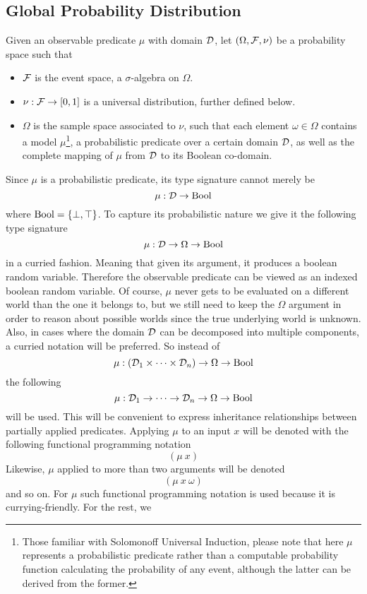 \documentclass[]{article}
\begin{document}
\subsection{Global Probability Distribution}
\label{sec:globalprob}
Given an observable predicate $\mu$ with domain $\mathcal{D}$, let
$(\Omega, \mathcal{F}, \nu)$ be a probability space such that
\begin{itemize}
\item $\mathcal{F}$ is the event space, a $\sigma$-algebra on $\Omega$.
\item $\nu : \mathcal{F} \to [0, 1]$ is a universal distribution, further
  defined below.
\item $\Omega$ is the sample space associated to $\nu$, such that each
  element $\omega \in \Omega$ contains a model $\mu$\footnote{Those
  familiar with Solomonoff Universal Induction, please note that here
  $\mu$ represents a probabilistic predicate rather than a computable
  probability function calculating the probability of any event,
  although the latter can be derived from the former.}, a
  probabilistic predicate over a certain domain $\mathcal{D}$, as well as
  the complete mapping of $\mu$ from $\mathcal{D}$ to its Boolean
  co-domain.
\end{itemize}
Since $\mu$ is a probabilistic predicate, its type signature cannot
merely be
$$\mu : \mathcal{D} \to \textup{Bool}$$ where $\textup{Bool} = \{\bot, \top\}$.  To capture
its probabilistic nature we give it the following type signature
$$\mu : \mathcal{D} \to \Omega \to \textup{Bool}$$ in a curried fashion.  Meaning
that given its argument, it produces a boolean random variable.
Therefore the observable predicate can be viewed as an indexed boolean
random variable.  Of course, $\mu$ never gets to be evaluated on a
different world than the one it belongs to, but we still need to keep
the $\Omega$ argument in order to reason about possible worlds since
the true underlying world is unknown.  Also, in cases where the domain
$\mathcal{D}$ can be decomposed into multiple components, a curried
notation will be preferred.  So instead of
$$\mu : (\mathcal{D}_1 \times \dots \times \mathcal{D}_n) \to \Omega \to \textup{Bool}$$
the following
$$\mu : \mathcal{D}_1 \to \dots \to \mathcal{D}_n \to \Omega \to \textup{Bool}$$ will
be used.  This will be convenient to express inheritance relationships
between partially applied predicates.  Applying $\mu$ to an input $x$
will be denoted with the following functional programming notation
$$(\mu\ x)$$ Likewise, $\mu$ applied to more than two arguments will
be denoted
$$(\mu\ x\ \omega)$$ and so on.  For $\mu$ such functional programming
notation is used because it is currying-friendly.  For the rest, we
\end{document}
